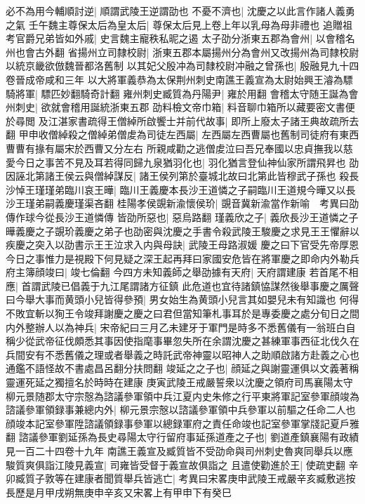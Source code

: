必不為用今輔順討逆|{
	順謂武陵王逆謂劭也}
不憂不濟也|{
	沈慶之以此言作諸人義勇之氣}
壬午魏主尊保太后為皇太后|{
	尊保太后見上卷上年以乳母為母非禮也}
追贈祖考官爵兄弟皆如外戚|{
	史言魏主寵秩私昵之遏}
太子劭分浙東五郡為會州|{
	以會稽名州也會古外翻}
省揚州立司隸校尉|{
	浙東五郡本屬揚州分為會州又改揚州為司隸校尉以統京畿欲倣魏晉都洛舊制}
以其妃父殷冲為司隸校尉冲融之曾孫也|{
	殷融見九十四卷晉成帝咸和三年}
以大將軍義恭為太保荆州刺史南譙王義宣為太尉始興王濬為驃騎將軍|{
	驃匹妙翻騎奇計翻}
雍州刺史臧質為丹陽尹|{
	雍於用翻}
會稽太守随王誕為會州刺史|{
	欲就會稽用誕統浙東五郡}
劭料檢文帝巾箱|{
	料音聊巾箱所以藏要密文書便於尋閲}
及江湛家書疏得王僧綽所啟饗士并前代故事|{
	即所上廢太子諸王典故疏所去翻}
甲申收僧綽殺之僧綽弟僧䖍為司徒左西屬|{
	左西屬左西曹屬也舊制司徒府有東西曹曹有掾有屬宋於西曹又分左右}
所親咸勸之逃僧䖍泣曰吾兄奉國以忠貞撫我以慈愛今日之事苦不見及耳若得同歸九泉猶羽化也|{
	羽化猶言登仙神仙家所謂飛昇也}
劭因誣北第諸王侯云與僧綽謀反|{
	諸王侯列第於臺城北故曰北第此皆穆武子孫也}
殺長沙悼王瑾瑾弟臨川哀王曄|{
	臨川王義慶本長沙王道憐之子嗣臨川王道規今曄又以長沙王瑾弟嗣義慶瑾渠吝翻}
桂陽孝侯覬新渝懷侯玠|{
	覬音冀新渝當作新喻　考異曰劭傳作球今從長沙王道憐傳}
皆劭所惡也|{
	惡烏路翻}
瑾義欣之子|{
	義欣長沙王道憐之子}
曄義慶之子覬玠義慶之弟子也劭密與沈慶之手書令殺武陵王駿慶之求見王王懼辭以疾慶之突入以劭書示王王泣求入内與母訣|{
	武陵王母路淑媛}
慶之曰下官受先帝厚恩今日之事惟力是視殿下何見疑之深王起再拜曰家國安危皆在將軍慶之即命内外勒兵府主簿顔竣曰|{
	竣七倫翻}
今四方未知義師之舉劭據有天府|{
	天府謂建康}
若首尾不相應|{
	首謂武陵已倡義于九江尾謂諸方征鎮}
此危道也宜待諸鎮恊謀然後舉事慶之厲聲曰今舉大事而黄頭小兒皆得參預|{
	男女始生為黄頭小兒言其如嬰兒未有知識也}
何得不敗宜斬以狥王令竣拜謝慶之慶之曰君但當知筆札事耳於是專委慶之處分旬日之間内外整辦人以為神兵|{
	宋帝紀曰三月乙未建牙于軍門是時多不悉舊儀有一翁班白自稱少從武帝征伐頗悉其事因使指麾事畢忽失所在余謂沈慶之甚練軍事西征北伐久在兵間安有不悉舊儀之理或者舉義之時託武帝神靈以昭神人之助順啟諸方赴義之心也通鑑不語怪故不書處昌呂翻分扶問翻}
竣延之之子也|{
	顔延之與謝靈運俱以文義著稱靈運死延之獨擅名於時時在建康}
庚寅武陵王戒嚴誓衆以沈慶之領府司馬襄陽太守柳元景随郡太守宗慤為諮議參軍領中兵江夏内史朱修之行平東將軍記室參軍顔竣為諮議參軍領録事兼總内外|{
	柳元景宗慤以諮議參軍領中兵參軍以前驅之任命二人也顔竣本記室參軍陞諮議領録事參軍以總録軍府之責任命竣也記室參軍掌牋記夏戶雅翻}
諮議參軍劉延孫為長史尋陽太守行留府事延孫道產之子也|{
	劉道產鎮襄陽有政績見一百二十四卷十九年}
南譙王義宣及臧質皆不受劭命與司州刺史魯爽同舉兵以應駿質爽俱詣江陵見義宣|{
	司雍皆受督于義宣故俱詣之}
且遣使勸進於王|{
	使疏吏翻}
辛卯臧質子敦等在建康者聞質舉兵皆逃亡|{
	考異曰宋畧庚申武陵王戒嚴辛亥臧敷逃按長歷是月甲戌朔無庚申辛亥又宋畧上有甲申下有癸巳}


